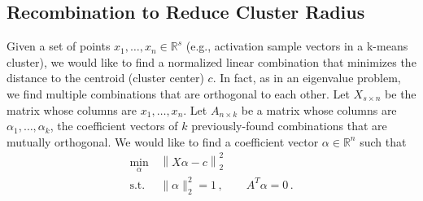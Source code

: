 \documentclass[11pt]{article}
\newcommand{\Real}{\mathbb{R}}
\begin{document}
\subsection{Recombination to Reduce Cluster Radius}
\label{sec:reduce_radius}
Given a set of points $x_1,\dots,x_n \in \Real^s$ (e.g., activation sample vectors in a k-means cluster), we would like to find a normalized linear combination that minimizes the distance to the centroid (cluster center) $c$. In fact, as in an eigenvalue problem, we find multiple combinations that are orthogonal to each other. Let $X_{s \times n}$ be the matrix whose columns are $x_1,\dots,x_n$. Let $A_{n \times k}$ be a matrix whose columns are $\alpha_1,\dots,\alpha_k$, the coefficient vectors of $k$ previously-found combinations that are mutually orthogonal. We would like to find a coefficient vector $\alpha \in \Real^n$ such that 
\begin{equation}
    \begin{aligned}
       \min_{\alpha}\, & \left\| X \alpha - c \right\|_2^2 \\
        \text{s.t.}\, & \|\alpha\|^2_2 = 1\,, \qquad A^T \alpha = 0\,.
    \end{aligned}
    \label{reduce_radius_min}
\end{equation}
\end{document}
